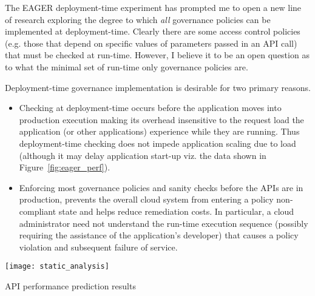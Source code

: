 The EAGER deployment-time experiment has prompted me to open a new line of
research exploring the degree to which {\em all} governance policies can be
implemented at deployment-time.  Clearly there are some access control
policies (e.g. those that depend on specific values of parameters passed in an
API call) that must be checked at run-time.  However, I believe it to be an
open question as to what the minimal set of run-time only governance policies
are.

Deployment-time governance implementation
is desirable for two primary reasons.

\begin{itemize}
\item Checking at deployment-time occurs before the application moves into
production execution making its overhead insensitive to the request load 
the application
(or other applications) experience while they are running.  Thus
deployment-time checking does not impede application scaling due to load
(although it may delay application start-up viz. the data shown in
Figure~\ref{fig:eager_perf}).
\item Enforcing most governance policies and sanity checks before the APIs are in production,
prevents the overall cloud system from entering a policy non-compliant state and helps reduce
remediation costs.  In particular, a cloud administrator need not understand
the run-time execution sequence (possibly requiring the assistance of the
application's developer) that causes a policy violation and subsequent failure
of service.
\end{itemize}

\begin{floatingfigure}[rb]{2.8in}
\vspace{-0.1in}
\texttt{[image: static\_analysis]}
\vspace{-0.08in}
\caption{API performance prediction results\label{fig:static_analysis}}
\end{floatingfigure}

